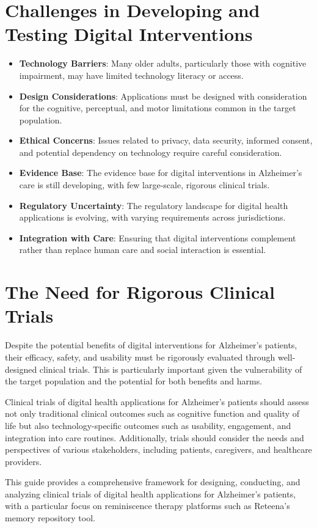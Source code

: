 \section{Challenges in Developing and Testing Digital Interventions}
\begin{itemize}
    \item \textbf{Technology Barriers}: Many older adults, particularly those with cognitive impairment, may have limited technology literacy or access.
    \item \textbf{Design Considerations}: Applications must be designed with consideration for the cognitive, perceptual, and motor limitations common in the target population.
    \item \textbf{Ethical Concerns}: Issues related to privacy, data security, informed consent, and potential dependency on technology require careful consideration.
    \item \textbf{Evidence Base}: The evidence base for digital interventions in Alzheimer's care is still developing, with few large-scale, rigorous clinical trials.
    \item \textbf{Regulatory Uncertainty}: The regulatory landscape for digital health applications is evolving, with varying requirements across jurisdictions.
    \item \textbf{Integration with Care}: Ensuring that digital interventions complement rather than replace human care and social interaction is essential.
\end{itemize}

\section{The Need for Rigorous Clinical Trials}
Despite the potential benefits of digital interventions for Alzheimer's patients, their efficacy, safety, and usability must be rigorously evaluated through well-designed clinical trials. This is particularly important given the vulnerability of the target population and the potential for both benefits and harms.

Clinical trials of digital health applications for Alzheimer's patients should assess not only traditional clinical outcomes such as cognitive function and quality of life but also technology-specific outcomes such as usability, engagement, and integration into care routines. Additionally, trials should consider the needs and perspectives of various stakeholders, including patients, caregivers, and healthcare providers.

This guide provides a comprehensive framework for designing, conducting, and analyzing clinical trials of digital health applications for Alzheimer's patients, with a particular focus on reminiscence therapy platforms such as Reteena's memory repository tool.